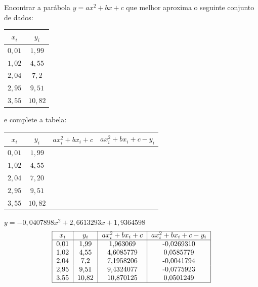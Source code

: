\documentclass[main.tex]{subfiles}
\begin{document}
\begin{Exercise}Encontrar  a parábola $y=ax^2+bx+c$ que melhor aproxima o seguinte conjunto de dados:
  \begin{center}
    \begin{tabular}{|c|c|}
      \hline
      $x_i$ & $y_i$\\
      \hline
      $0,01$ & $1,99$\\
      $1,02$ & $4,55$\\
      $2,04$ & $7,2$\\
      $2,95$ & $9,51$\\
      $3,55$ & $10,82$\\
      \hline
    \end{tabular}    
  \end{center}
  e complete a tabela:
  \begin{center}
    \begin{tabular}{|c|c|c|c|}
      \hline
      $x_i$ & $y_i$& $ax_i^2+bx_i+c$& $ax_i^2+bx_i+c-y_i$\\
      \hline
      $0,01$ & $1,99$& &\\
      $1,02$ & $4,55$&& \\
      $2,04$ & $7,20$&  & \\
      $2,95$ & $9,51$  &  & \\
      $3,55$ & $10,82$&&\\
      \hline
    \end{tabular}
  \end{center}
\end{Exercise}
\begin{Answer}
  \begin{tiny}
$y=-0,0407898x^2+ 2,6613293x+ 1,9364598$    
\begin{equation*}
\begin{tabular}{|c|c|c|c|}
\hline
$x_i$ & $y_i$& $ax_i^2+bx_i+c$& $ax_i^2+bx_i+c-y_i$\\
\hline
0,01 & 1,99&1,963069&-0,0269310  \\
1,02 & 4,55&4,6085779&    0,0585779  \\
2,04 & 7,2&7,1958206  &  -0,0041794  \\
2,95 & 9,51& 9,4324077   &-0,0775923   \\
3,55 & 10,82& 10,870125   &0,0501249\\
\hline
\end{tabular}  
\end{equation*}
  \end{tiny}
\end{Answer}
\end{document}
